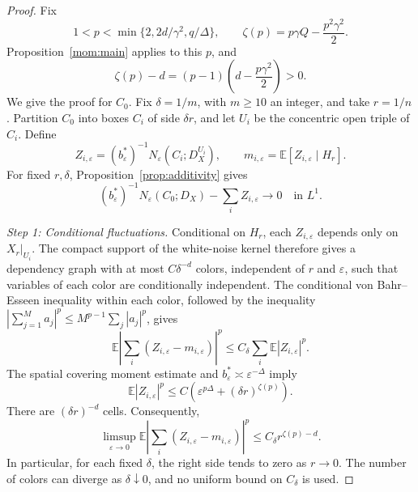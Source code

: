 \documentclass[11pt,letterpaper]{article}
\newcommand{\E}{\mathbb E}
\newcommand{\eps}{\varepsilon}
\theoremstyle{definition}
\theoremstyle{remark}
\numberwithin{equation}{section}
\begin{document}
\begin{proof}
Fix
\begin{equation*}
 1<p<\min\{2,2d/\gamma^2,q/\Delta\},\qquad
 \zeta(p)=p\gamma Q-\frac{p^2\gamma^2}{2}.
\end{equation*}
Proposition~\ref{mom:main} applies to this $p$, and
\begin{equation}\label{eq:positive-zeta-gap}
 \zeta(p)-d=(p-1)\left(d-\frac{p\gamma^2}{2}\right)>0.
\end{equation}
We give the proof for $C_0$. Fix $\delta=1/m$, with $m\ge10$ an integer, and take $r=1/n$. Partition $C_0$ into boxes $C_i$ of side $\delta r$, and let $U_i$ be the concentric open triple of $C_i$. Define
\begin{equation*}
 Z_{i,\eps}=(b_\eps^*)^{-1}N_\eps(C_i;D_X^{U_i}),
 \qquad m_{i,\eps}=\E[Z_{i,\eps}\mid H_r].
\end{equation*}
For fixed $r,\delta$, Proposition~\ref{prop:additivity} gives
\begin{equation}\label{eq:local-cover-sum}
 (b_\eps^*)^{-1}N_\eps(C_0;D_X)-\sum_iZ_{i,\eps}
 \longrightarrow0\quad\text{in }L^1.
\end{equation}

\emph{Step 1: Conditional fluctuations.} Conditional on $H_r$, each $Z_{i,\eps}$ depends only on $X_r|_{U_i}$. The compact support of the white-noise kernel therefore gives a dependency graph with at most $C\delta^{-d}$ colors, independent of $r$ and $\eps$, such that variables of each color are conditionally independent. The conditional von Bahr--Esseen inequality within each color, followed by the inequality
$|\sum_{j=1}^M a_j|^p\le M^{p-1}\sum_j|a_j|^p$, gives
\begin{equation*}
 \E\left|\sum_i(Z_{i,\eps}-m_{i,\eps})\right|^p
 \le C_\delta\sum_i\E|Z_{i,\eps}|^p.
\end{equation*}
The spatial covering moment estimate and $b_\eps^*\asymp\eps^{-\Delta}$ imply
\begin{equation*}
 \E|Z_{i,\eps}|^p
 \le C\left(\eps^{p\Delta}+(\delta r)^{\zeta(p)}\right).
\end{equation*}
There are $(\delta r)^{-d}$ cells. Consequently,
\begin{equation}\label{eq:conditional-cover-concentration}
 \limsup_{\eps\to0}
 \E\left|\sum_i(Z_{i,\eps}-m_{i,\eps})\right|^p
 \le C_\delta r^{\zeta(p)-d}.
\end{equation}
In particular, for each fixed $\delta$, the right side tends to zero as $r\to0$. The number of colors can diverge as $\delta\downarrow0$, and no uniform bound on $C_\delta$ is used.


\end{proof}
\end{document}

